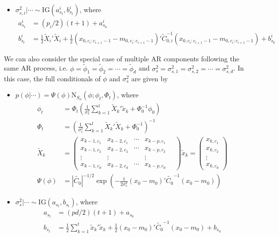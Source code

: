 \documentclass{article}
\begin{document}
\begin{itemize}
\item $\sigma^2_{s,i}|\cdots \sim \mbox{IG}(a^i_{s_t}, b^i_{s_t})$, where
\begin{align*}
a^i_{s_t} &= (p_i/2)(t+1) + a^i_{s_0} \\
b^i_{s_t} &= \frac{1}{2}\tilde{X}_i'\tilde{X}_i + \frac{1}{2}(x_{0,c_i:c_{i+1}-1}-m_{0,c_i:c_{i+1}-1})'\tilde{C}_{0,i}^{-1}(x_{0,c_i:c_{i+1}-1}-m_{0,c_i:c_{i+1}-1}) + b^i_{s_0}
\end{align*}
\end{itemize}

\noindent We can also consider the special case of multiple AR components following the same AR process, i.e. $\phi = \tilde{\phi}_1 = \tilde{\phi}_2 = \cdots = \tilde{\phi}_d$ and $\sigma^2_s = \sigma^2_{s,1} = \sigma^2_{s,2} = \cdots = \sigma^2_{s,d}$. In this case, the full conditionals of $\phi$ and $\sigma^2_s$ are given by
\begin{itemize}
\item $p(\phi|\cdots) = \Psi(\phi)\mbox{N}_{S_\phi}(\phi; \phi_t,\Phi_t)$, where
\begin{align*}
\phi_t &= \Phi_t\left(\frac{1}{\sigma^2_s} \sum_{k=1}^t \tilde{X}_k'\tilde{x}_k + \Phi_0^{-1}\phi_0\right) \\
\Phi_t &= \left(\frac{1}{\sigma^2_s} \sum_{k=1}^t \tilde{X}_k'\tilde{X}_k + \Phi_0^{-1}\right)^{-1} \\
\tilde{X}_k &= \left(\begin{array}{ccccc}
x_{k-1,c_1} & x_{k-2,c_1} & \cdots & x_{k-p,c_1} \\
x_{k-1,c_2} & x_{k-2,c_2} & \cdots & x_{k-p,c_2} \\
\vdots & \vdots & & \vdots \\
x_{k-1,c_d} & x_{k-2,c_d} & \cdots & x_{k-p,c_d}
\end{array} \quad
\right) \tilde{x}_k = \left(\begin{array}{c} x_{k,c_1} \\ x_{k,c_2} \\ \vdots \\ x_{k,c_d} \end{array}\right) \\
\Psi(\phi) &= \left|\tilde{C_0}\right|^{-1/2}\exp\left(-\frac{1}{2\sigma^2_s}(x_0-m_0)'\tilde{C_0}^{-1}(x_0-m_0)\right)
\end{align*}
\item $\sigma^2_s|\cdots \sim \mbox{IG}(a_{s_t}, b_{s_t})$, where
\begin{align*}
a_{s_t} &= (pd/2)(t+1) + a_{s_0} \\
b_{s_t} &= \frac{1}{2}\sum_{k=1}^t \tilde{x}_k'\tilde{x}_k + \frac{1}{2}(x_0-m_0)'\tilde{C_0}^{-1}(x_0-m_0) + b_{s_0}
\end{align*}
\end{itemize}

\clearpage



\end{document}
